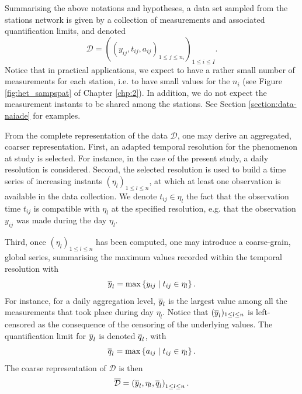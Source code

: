Summarising the above notations and hypotheses, a data set sampled from the stations network is given by a collection of measurements and associated quantification limits, and denoted
\begin{equation*}
 \mathcal{D}=\left(\left(y_{ij},t_{ij}, a_{ij}\right)_{1\leq j\leq n_i}\right)_{1\leq i\leq I}.   
\end{equation*}
Notice that in practical applications, we expect to have a rather small number of measurements for each station, i.e. to have small values for the $n_i$ (see Figure \ref{fig:het_sampspat} of Chapter \ref{chp:2}). In addition, we do not expect the measurement instants to be shared among the stations. See Section \ref{section:data-naiade} for examples. 


From the complete representation of the data $\mathcal{D}$, one may derive an aggregated, coarser representation. First, an adapted temporal resolution for the phenomenon at study is selected. For instance, in the case of the present study, a daily resolution is considered. Second, the selected resolution is used to build a time series of increasing instants $(\eta_l)_{1\leq l\leq n}$, at which at least one observation is available in the data collection. We denote $t_{ij}\in\eta_l$ the fact that the observation time $t_{ij}$ is compatible with $\eta_l$ at the specified resolution, e.g. that the observation $y_{ij}$ was made during the day $\eta_l$. 

Third, once $(\eta_l)_{1\leq l\leq n}$ has been computed,  one may introduce a coarse-grain, global series, summarising the maximum values recorded within the temporal resolution with
\begin{equation}
\overline{y}_l=\max\left\{y_{ij} \mid t_{ij}\in\eta_l\right\}.
\end{equation}
For instance, for a daily aggregation level, $\overline{y}_l$ is the largest value among all the measurements that took place during day $\eta_l$. Notice that $(\overline{y}_l)_{1\leq l\leq n}$ is left-censored as the consequence of the censoring of the underlying values. The quantification limit for $\overline{y}_l$ is denoted $\overline{q}_l$, with
\begin{equation}
\overline{q}_l=\max\left\{a_{ij}\mid t_{ij}\in\eta_l\right\}.   
\end{equation}
The coarse representation of $\mathcal{D}$ is then
\begin{equation}
\overline{\mathcal{D}}=\left(\overline{y}_l, \eta_l, \overline{q}_l\right)_{1\leq l\leq n}.
\end{equation}

